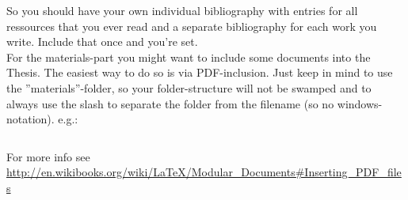 \documentclass[a4paper, 12pt,oneside]{article}
\begin{document}
So you should have your own individual bibliography with entries for all ressources that you ever read and a separate bibliography for each work you write. Include that once and you're set. \\

For the materials-part you might want to include some documents into the Thesis. The easiest way to do so is via  PDF-inclusion. Just keep in mind to use the ''materials''-folder, so your folder-structure will not be swamped and to always use the slash to separate the folder from the filename (so no windows-notation). e.g.:
\begin{verbatim}

\end{verbatim}
For more info see \url{http://en.wikibooks.org/wiki/LaTeX/Modular_Documents#Inserting_PDF_files}\\



\newpage %

%
%
%
%



%
%
%
%



\setcounter{page}{1}
\hypersetup{pageanchor=true}

\end{document}
